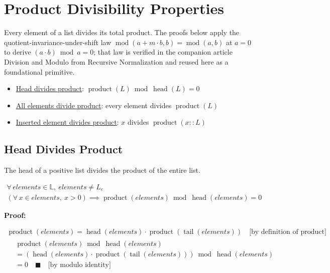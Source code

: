\section{Product Divisibility Properties}
\label{sec:product-divisibility}

Every element of a list divides its total product. The proofs below apply
the quotient-invariance-under-shift law
$\operatorname{mod}(a + m \cdot b, b) = \operatorname{mod}(a, b)$ at
$a = 0$ to derive $(a \cdot b) \bmod a = 0$; that law is verified in the
companion article
Division and Modulo from Recursive Normalization \cite{mata2026modulo}
and reused here as a foundational primitive.

\begin{itemize}
  \item \href{https://github.com/thiagomata/prime-numbers/blob/list-article-v1.0.0/src/main/scala/v1/chapter3/list/properties/ListProductDiv.scala}{Head divides product}:
    $\operatorname{product}(L) \bmod \operatorname{head}(L) = 0$
  \item \href{https://github.com/thiagomata/prime-numbers/blob/list-article-v1.0.0/src/main/scala/v1/chapter3/list/properties/ListProductDiv.scala}{All elements divide product}:
    every element divides $\operatorname{product}(L)$
  \item \href{https://github.com/thiagomata/prime-numbers/blob/list-article-v1.0.0/src/main/scala/v1/chapter3/list/properties/ListProductDiv.scala}{Inserted element divides product}:
    $x$ divides $\operatorname{product}(x :: L)$
\end{itemize}

\subsection{Head Divides Product}

The head of a positive list divides the product of the entire list.

\begin{gather*}
\forall\, elements \in \mathbb{L},\ elements \neq L_e \\
(\forall\, x \in elements,\ x > 0) \implies \operatorname{product}(elements) \bmod \operatorname{head}(elements) = 0
\end{gather*}

\textbf{Proof:}

\begin{gather*}
\operatorname{product}(elements) = \operatorname{head}(elements) \cdot \operatorname{product}(\operatorname{tail}(elements))
\quad \text{[by definition of product]} \\
\begin{aligned}
&\operatorname{product}(elements) \bmod \operatorname{head}(elements) \\
&= (\operatorname{head}(elements) \cdot \operatorname{product}(\operatorname{tail}(elements))) \bmod \operatorname{head}(elements) \\
&= 0 \quad \blacksquare \quad \text{[by modulo identity]}
\end{aligned}
\end{gather*}

